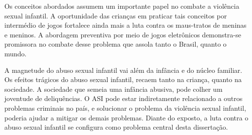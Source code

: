 Os conceitos abordados assumem um importante papel no combate a violência sexual infantil. A oportunidade das crianças em praticar tais conceitos por intermédio de jogos fortalece ainda mais a luta contra os maus-tratos de meninas e meninos. A abordagem preventiva por meio de jogos eletrônicos demonstra-se promissora no combate desse problema que assola tanto o Brasil, quanto o mundo. 


A magnetude do abuso sexual infantil vai além da infância e do núcleo familiar. Os efeitos trágicos do abuso sexual infantil, recaem tanto na criança, quanto na sociedade. A sociedade que semeia uma infância abusiva, pode colher um joventude de deliquências. O ASI pode estar indiretamente relacionado a outros problemas criminais no país, e solucionar o problema da violência sexual infantil, poderia ajudar a mitigar os demais problemas. Diante do exposto, a luta contra o abuso sexual infantil se configura como problema central desta dissertação.  %







